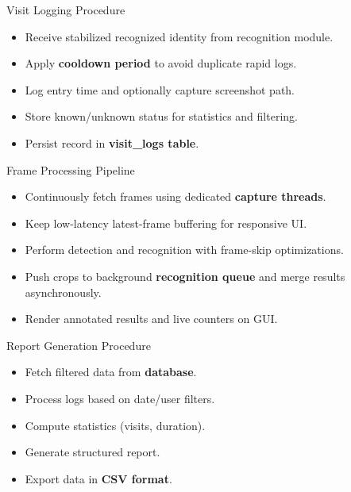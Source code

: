 \documentclass[10pt]{beamer}
\begin{document}
\begin{frame}{Visit Logging Procedure}

\begin{itemize}
    \item Receive stabilized recognized identity from recognition module.
    
    \item Apply \textbf{cooldown period} to avoid duplicate rapid logs.
    
    \item Log entry time and optionally capture screenshot path.
    
    \item Store known/unknown status for statistics and filtering.
    \item Persist record in \textbf{visit\_logs table}.
\end{itemize}

\end{frame}
\begin{frame}{Frame Processing Pipeline}

\begin{itemize}
    \item Continuously fetch frames using dedicated \textbf{capture threads}.
    \item Keep low-latency latest-frame buffering for responsive UI.
    \item Perform detection and recognition with frame-skip optimizations.
    \item Push crops to background \textbf{recognition queue} and merge results asynchronously.
    \item Render annotated results and live counters on GUI.
\end{itemize}

\end{frame}
\begin{frame}{Report Generation Procedure}

\begin{itemize}
    \item Fetch filtered data from \textbf{database}.
    
    \item Process logs based on date/user filters.
    
    \item Compute statistics (visits, duration).
    
    \item Generate structured report.
    
    \item Export data in \textbf{CSV format}.
\end{itemize}
\end{frame}
\end{document}
